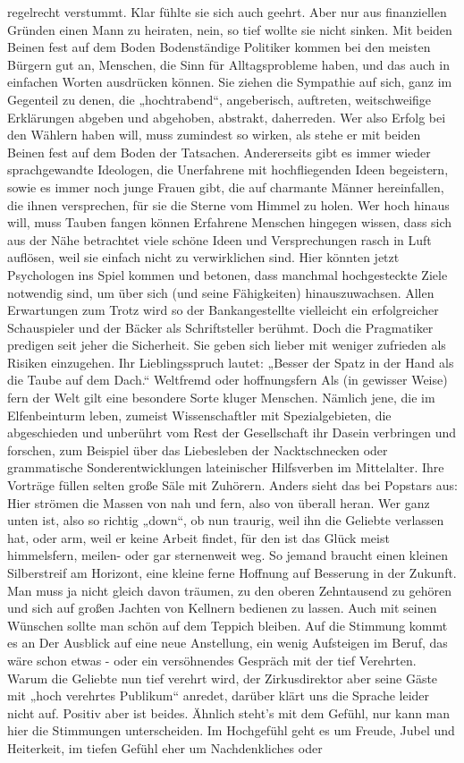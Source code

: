 \documentclass[14pt,a4paper]{extarticle}
\begin{document}
regelrecht verstummt. Klar fühlte sie sich auch geehrt. Aber nur aus finanziellen Gründen einen Mann zu heiraten, nein, so tief wollte sie nicht sinken.  Mit beiden Beinen fest auf dem Boden  Bodenständige Politiker kommen bei den meisten Bürgern gut an, Menschen, die Sinn für Alltagsprobleme haben, und das auch in einfachen Worten ausdrücken können. Sie ziehen die Sympathie auf sich, ganz im Gegenteil zu denen, die „hochtrabend“, angeberisch, auftreten, weitschweifige Erklärungen abgeben und abgehoben, abstrakt, daherreden. Wer also Erfolg bei den Wählern haben will, muss zumindest so wirken, als stehe er mit beiden Beinen fest auf dem Boden der Tatsachen.  Andererseits gibt es immer wieder sprachgewandte Ideologen, die Unerfahrene mit hochfliegenden Ideen begeistern, sowie es immer noch junge Frauen gibt, die auf charmante Männer hereinfallen, die ihnen versprechen, für sie die Sterne vom Himmel zu holen.  Wer hoch hinaus will, muss Tauben fangen können  Erfahrene Menschen hingegen wissen, dass sich aus der Nähe betrachtet viele schöne Ideen und Versprechungen rasch in Luft auflösen, weil sie einfach nicht zu verwirklichen sind. Hier könnten jetzt Psychologen ins Spiel kommen und betonen, dass manchmal hochgesteckte Ziele notwendig sind, um über sich (und seine Fähigkeiten) hinauszuwachsen.  Allen Erwartungen zum Trotz wird so der Bankangestellte vielleicht ein erfolgreicher Schauspieler und der Bäcker als Schriftsteller berühmt. Doch die Pragmatiker predigen seit jeher die Sicherheit. Sie geben sich lieber mit weniger zufrieden als Risiken einzugehen. Ihr Lieblingsspruch lautet: „Besser der Spatz in der Hand als die Taube auf dem Dach.“  Weltfremd oder hoffnungsfern  Als (in gewisser Weise) fern der Welt gilt eine besondere Sorte kluger Menschen. Nämlich jene, die im Elfenbeinturm leben, zumeist Wissenschaftler mit Spezialgebieten, die abgeschieden und unberührt vom Rest der Gesellschaft ihr Dasein verbringen und forschen, zum Beispiel über das Liebesleben der Nacktschnecken oder grammatische Sonderentwicklungen lateinischer Hilfsverben im Mittelalter. Ihre Vorträge füllen selten große Säle mit Zuhörern. Anders sieht das bei Popstars aus: Hier strömen die Massen von nah und fern, also von überall heran.  Wer ganz unten ist, also so richtig „down“, ob nun traurig, weil ihn die Geliebte verlassen hat, oder arm, weil er keine Arbeit findet, für den ist das Glück meist himmelsfern, meilen- oder gar sternenweit weg. So jemand braucht einen kleinen Silberstreif am Horizont, eine kleine ferne Hoffnung auf Besserung in der Zukunft. Man muss ja nicht gleich davon träumen, zu den oberen Zehntausend zu gehören und sich auf großen Jachten von Kellnern bedienen zu lassen. Auch mit seinen Wünschen sollte man schön auf dem Teppich bleiben.  Auf die Stimmung kommt es an  Der Ausblick auf eine neue Anstellung, ein wenig Aufsteigen im Beruf, das wäre schon etwas - oder ein versöhnendes Gespräch mit der tief Verehrten. Warum die Geliebte nun tief verehrt wird, der Zirkusdirektor aber seine Gäste mit „hoch verehrtes Publikum“ anredet, darüber klärt uns die Sprache leider nicht auf. Positiv aber ist beides.  Ähnlich steht’s mit dem Gefühl, nur kann man hier die Stimmungen unterscheiden. Im Hochgefühl geht es um Freude, Jubel und Heiterkeit, im tiefen Gefühl eher um Nachdenkliches oder 
\end{document}

